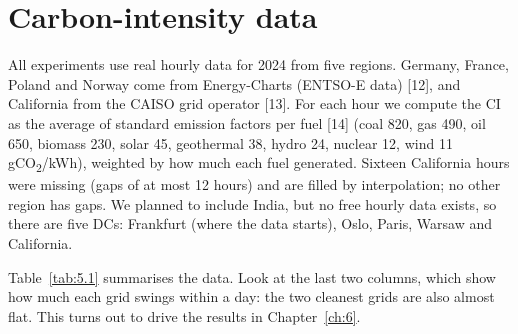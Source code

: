 \documentclass[12pt,a4paper,oneside,openany]{report}
\begin{document}
\section{Carbon-intensity data}\label{sec:5.1}

All experiments use real hourly data for 2024 from five regions.
Germany, France, Poland and Norway come from Energy-Charts (ENTSO-E
data) {[}12{]}, and California from the CAISO grid operator {[}13{]}.
For each hour we compute the CI as the average of standard emission
factors per fuel {[}14{]} (coal 820, gas 490, oil 650, biomass 230,
solar 45, geothermal 38, hydro 24, nuclear 12, wind 11 gCO\textsubscript{2}/kWh),
weighted by how much each fuel generated. Sixteen California hours were
missing (gaps of at most 12 hours) and are filled by interpolation; no
other region has gaps. We planned to include India, but no free hourly
data exists, so there are five DCs: Frankfurt (where the data starts),
Oslo, Paris, Warsaw and California.

Table~\ref{tab:5.1} summarises the data. Look at the last two columns, which show
how much each grid swings within a day: the two cleanest grids are also
almost flat. This turns out to drive the results in Chapter~\ref{ch:6}.
\end{document}
